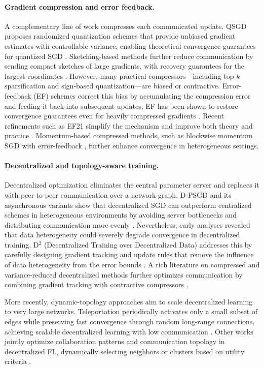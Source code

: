 \paragraph{Gradient compression and error feedback.}
A complementary line of work compresses each communicated update. QSGD proposes randomized quantization schemes that provide unbiased gradient estimates with controllable variance, enabling theoretical convergence guarantees for quantized SGD \cite{alistarh2017qsgd}. Sketching-based methods further reduce communication by sending compact sketches of large gradients, with recovery guarantees for the largest coordinates \cite{li2019sketchedsgd}. However, many practical compressors---including top-$k$ sparsification and sign-based quantization---are biased or contractive. Error-feedback (EF) schemes correct this bias by accumulating the compression error and feeding it back into subsequent updates; EF has been shown to restore convergence guarantees even for heavily compressed gradients \cite{karimireddy2019errorfeedback}. Recent refinements such as EF21 simplify the mechanism and improve both theory and practice \cite{richtarik2021ef21}. Momentum-based compressed methods, such as blockwise momentum SGD with error-feedback \cite{zheng2019blockmomentumEF}, further enhance convergence in heterogeneous settings.

\paragraph{Decentralized and topology-aware training.}
Decentralized optimization eliminates the central parameter server and replaces it with peer-to-peer communication over a network graph. D-PSGD and its asynchronous variants show that decentralized SGD can outperform centralized schemes in heterogeneous environments by avoiding server bottlenecks and distributing communication more evenly \cite{lian2017dpsgd}. Nevertheless, early analyses revealed that data heterogeneity could severely degrade convergence in decentralized training. D$^2$ (Decentralized Training over Decentralized Data) addresses this by carefully designing gradient tracking and update rules that remove the influence of data heterogeneity from the error bounds \cite{tang2018d2}. A rich literature on compressed and variance-reduced decentralized methods further optimizes communication by combining gradient tracking with contractive compressors \cite{li2019communicationGradientTracking,liao2022compressedDecentralized}.

More recently, dynamic-topology approaches aim to scale decentralized learning to very large networks. Teleportation periodically activates only a small subset of edges while preserving fast convergence through random long-range connections, achieving scalable decentralized learning with low communication \cite{takezawa2025teleportation}. Other works jointly optimize collaboration patterns and communication topology in decentralized FL, dynamically selecting neighbors or clusters based on utility criteria \cite{jiang2025dfedmq}.

